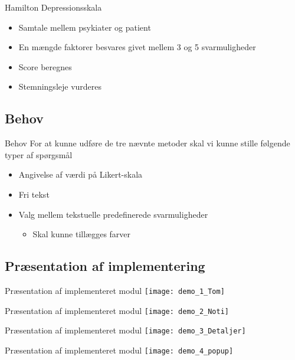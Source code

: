 { %
\begin{frame}{Hamilton Depressionsskala} %
	\begin{itemize}
		\item Samtale mellem psykiater og patient
		\item En mængde faktorer besvares givet mellem 3 og 5 svarmuligheder
		\item Score beregnes
		\item Stemningsleje vurderes
	\end{itemize}
	
	
\end{frame}}
	
\subsection{Behov}
{ %
\begin{frame}{Behov} %
For at kunne udføre de tre nævnte metoder skal vi kunne stille følgende typer af spørgsmål


\begin{itemize}
	\item Angivelse af værdi på Likert-skala
	\item Fri tekst
	\item Valg mellem tekstuelle predefinerede svarmuligheder
	\begin{itemize}
		\item Skal kunne tillægges farver
	\end{itemize}
\end{itemize}
\end{frame}}

\subsection{Præsentation af implementering}
\begin{frame}{Præsentation af implementeret modul} %
\centering
\texttt{[image: demo\_1\_Tom]}
\end{frame}

\begin{frame}{Præsentation af implementeret modul} %
	\centering
	\texttt{[image: demo\_2\_Noti]}
\end{frame}

\begin{frame}{Præsentation af implementeret modul} %
	\centering
	\texttt{[image: demo\_3\_Detaljer]}
\end{frame}

\begin{frame}{Præsentation af implementeret modul} %
	\centering
	\texttt{[image: demo\_4\_popup]}
\end{frame}